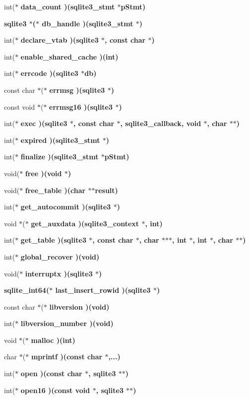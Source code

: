 \begin{CompactItemize}
int($\ast$ \bf{data\_\-count} )(\bf{sqlite3\_\-stmt} $\ast$p\-Stmt)
\item 
\bf{sqlite3} $\ast$($\ast$ \bf{db\_\-handle} )(\bf{sqlite3\_\-stmt} $\ast$)
\item 
int($\ast$ \bf{declare\_\-vtab} )(\bf{sqlite3} $\ast$, const char $\ast$)
\item 
int($\ast$ \bf{enable\_\-shared\_\-cache} )(int)
\item 
int($\ast$ \bf{errcode} )(\bf{sqlite3} $\ast$\bf{db})
\item 
const char $\ast$($\ast$ \bf{errmsg} )(\bf{sqlite3} $\ast$)
\item 
const void $\ast$($\ast$ \bf{errmsg16} )(\bf{sqlite3} $\ast$)
\item 
int($\ast$ \bf{exec} )(\bf{sqlite3} $\ast$, const char $\ast$, \bf{sqlite3\_\-callback}, void $\ast$, char $\ast$$\ast$)
\item 
int($\ast$ \bf{expired} )(\bf{sqlite3\_\-stmt} $\ast$)
\item 
int($\ast$ \bf{finalize} )(\bf{sqlite3\_\-stmt} $\ast$p\-Stmt)
\item 
void($\ast$ \bf{free} )(void $\ast$)
\item 
void($\ast$ \bf{free\_\-table} )(char $\ast$$\ast$result)
\item 
int($\ast$ \bf{get\_\-autocommit} )(\bf{sqlite3} $\ast$)
\item 
void $\ast$($\ast$ \bf{get\_\-auxdata} )(\bf{sqlite3\_\-context} $\ast$, int)
\item 
int($\ast$ \bf{get\_\-table} )(\bf{sqlite3} $\ast$, const char $\ast$, char $\ast$$\ast$$\ast$, int $\ast$, int $\ast$, char $\ast$$\ast$)
\item 
int($\ast$ \bf{global\_\-recover} )(void)
\item 
void($\ast$ \bf{interruptx} )(\bf{sqlite3} $\ast$)
\item 
\bf{sqlite\_\-int64}($\ast$ \bf{last\_\-insert\_\-rowid} )(\bf{sqlite3} $\ast$)
\item 
const char $\ast$($\ast$ \bf{libversion} )(void)
\item 
int($\ast$ \bf{libversion\_\-number} )(void)
\item 
void $\ast$($\ast$ \bf{malloc} )(int)
\item 
char $\ast$($\ast$ \bf{mprintf} )(const char $\ast$,...)
\item 
int($\ast$ \bf{open} )(const char $\ast$, \bf{sqlite3} $\ast$$\ast$)
\item 
int($\ast$ \bf{open16} )(const void $\ast$, \bf{sqlite3} $\ast$$\ast$)
$$
\end{CompactItemize}
